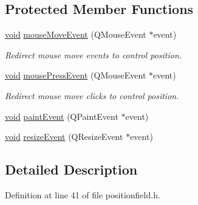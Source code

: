 \subsection*{\-Protected \-Member \-Functions}
\begin{DoxyCompactItemize}
\item 
\hyperlink{group___u_a_v_objects_plugin_ga444cf2ff3f0ecbe028adce838d373f5c}{void} \hyperlink{group___g_c_s_control_gadget_plugin_gafb1fc61ba09724c992e090e61ea70a77}{mouse\-Move\-Event} (\-Q\-Mouse\-Event $\ast$event)
\begin{DoxyCompactList}\small\item\em \-Redirect mouse move events to control position. \end{DoxyCompactList}\item 
\hyperlink{group___u_a_v_objects_plugin_ga444cf2ff3f0ecbe028adce838d373f5c}{void} \hyperlink{group___g_c_s_control_gadget_plugin_ga4e4feaca4c455eaf3f781ac5c02eb0ad}{mouse\-Press\-Event} (\-Q\-Mouse\-Event $\ast$event)
\begin{DoxyCompactList}\small\item\em \-Redirect mouse move clicks to control position. \end{DoxyCompactList}\item 
\hyperlink{group___u_a_v_objects_plugin_ga444cf2ff3f0ecbe028adce838d373f5c}{void} \hyperlink{group___g_c_s_control_gadget_plugin_gad910afda0ec90e5e5e1dd3abd854f709}{paint\-Event} (\-Q\-Paint\-Event $\ast$event)
\item 
\hyperlink{group___u_a_v_objects_plugin_ga444cf2ff3f0ecbe028adce838d373f5c}{void} \hyperlink{group___g_c_s_control_gadget_plugin_ga4f1879516e3c2fb610a4ebe9f5cb217e}{resize\-Event} (\-Q\-Resize\-Event $\ast$event)
\end{DoxyCompactItemize}


\subsection{\-Detailed \-Description}


\-Definition at line 41 of file positionfield.\-h.



